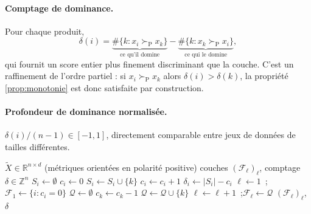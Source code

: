 \documentclass[11pt,a4paper]{article}
\theoremstyle{definition}
\theoremstyle{remark}
\newcommand{\R}{\mathbb{R}}
\newcommand{\Z}{\mathbb{Z}}
\newcommand{\abs}[1]{\left\lvert #1 \right\rvert}
\newcommand{\pareto}{\succ_{\mathrm{P}}}
\begin{document}
\bigskip

\paragraph{Comptage de dominance.} Pour chaque produit,
\[
\delta(i) = \underbrace{\#\{k : x_i \pareto x_k\}}_{\text{ce qu'il domine}}
          - \underbrace{\#\{k : x_k \pareto x_i\}}_{\text{ce qui le domine}},
\]
qui fournit un score entier plus finement discriminant que la couche. C'est un raffinement de
l'ordre partiel : si $x_i \pareto x_k$ alors $\delta(i) > \delta(k)$, la
propriété \ref{prop:monotonie} est donc satisfaite par construction.

\bigskip

\paragraph{Profondeur de dominance normalisée.} $\delta(i)/(n-1) \in [-1,1]$, directement
comparable entre jeux de données de tailles différentes.

\medskip

\begin{algorithm}[htbp]
  \caption{Tri non dominé et comptage de dominance}
  \label{algo:nds}
  \begin{algorithmic}[1]
  \Require $\tilde{X}\in\R^{n\times d}$ (métriques orientées en polarité positive)
  \Ensure couches $(\mathcal{F}_\ell)_\ell$, comptage $\delta \in \Z^n$
    \State $S_i \gets \emptyset$ 
    \State $c_i \gets 0$ 
      \If{$\tilde{x}_i \pareto \tilde{x}_k$} $S_i \gets S_i \cup \{k\}$
      \ElsIf{$\tilde{x}_k \pareto \tilde{x}_i$} $c_i \gets c_i + 1$
      \EndIf
    \EndFor
    \State $\delta_i \gets \abs{S_i} - c_i$
  \EndFor
  \State $\ell \gets 1$~;\quad $\mathcal{F}_1 \gets \{i : c_i = 0\}$
    \State $\mathcal{Q} \gets \emptyset$
        \State $c_k \gets c_k - 1$
         $\mathcal{Q} \gets \mathcal{Q}\cup\{k\}$ 
        \EndIf
      \EndFor
    \EndFor
    \State $\ell \gets \ell + 1$~;\quad $\mathcal{F}_\ell \gets \mathcal{Q}$
  \EndWhile
  \State \Return $(\mathcal{F}_\ell)_\ell$, $\delta$
  \end{algorithmic}
\end{algorithm}
\end{document}
